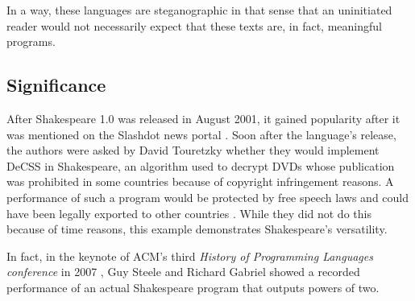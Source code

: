 In a way, these languages are steganographic in that sense that an uninitiated reader would not necessarily expect that these texts are, in fact, meaningful programs.

\subsection{Significance}

After Shakespeare 1.0 was released in August 2001, it gained popularity after it was mentioned on the Slashdot news portal \cite{tjernlund2001shakespeare}. Soon after the language's release, the authors were asked by David Touretzky whether they would implement DeCSS in Shakespeare, an algorithm used to decrypt DVDs whose publication was prohibited in some countries because of copyright infringement reasons. A performance of such a program would be protected by free speech laws and could have been legally exported to other countries \cite{herrick2011az}. While they did not do this because of time reasons, this example demonstrates Shakespeare's versatility.

In fact, in the keynote of ACM's third \emph{History of Programming Languages conference} in 2007 \cite{chapiewski2007computational}, Guy Steele and Richard Gabriel showed a recorded performance of an actual Shakespeare program that outputs powers of two.

